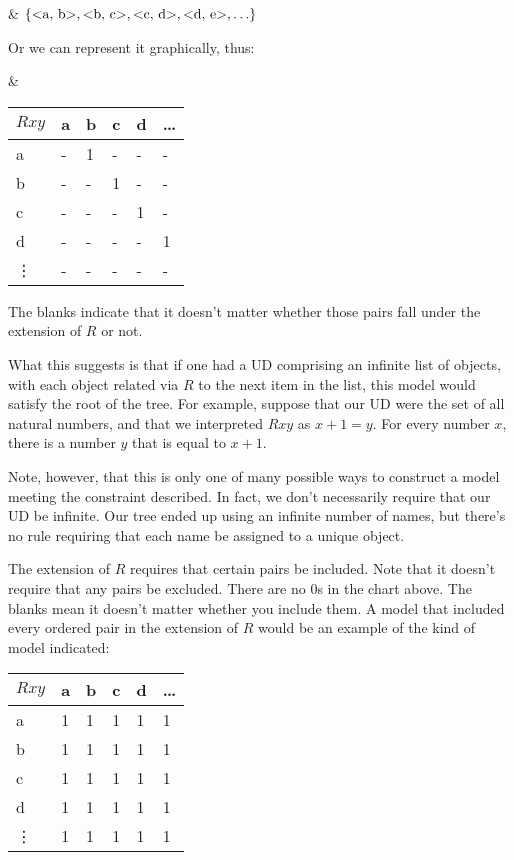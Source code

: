 \begin{partialmodel}
	 & $ \{\mbox{\ensuremath{\mathopen{<}}a, b\ensuremath{\mathclose{>}}}, \mbox{\ensuremath{\mathopen{<}}b, c\ensuremath{\mathclose{>}}}, \mbox{\ensuremath{\mathopen{<}}c, d\ensuremath{\mathclose{>}}}, \mbox{\ensuremath{\mathopen{<}}d, e\ensuremath{\mathclose{>}}}, \ldots\}$
\end{partialmodel}

Or we can represent it graphically, thus: 

\begin{partialmodel}
	 & \begin{tabular}{l|lllll}
$Rxy$   & a & b & c & d & \ldots \\ \hline
a   & - & 1 & - & - & -   \\
b   & - & - & 1 & - & -   \\
c   & - & - & - & 1 & -   \\
d   & - & - & - & - & 1   \\
\vdots & - & - & - & - & -
\end{tabular}
\end{partialmodel}



The blanks indicate that it doesn't matter whether those pairs fall under the extension of $R$ or not.

What this suggests is that if one had a UD comprising an infinite list of objects, with each object related via $R$ to the next item in the list, this model would satisfy the root of the tree. For example, suppose that our UD were the set of all natural numbers, and that we interpreted $Rxy$ as $x+1=y$. For every number $x$, there is a number $y$ that is equal to $x+1$.

Note, however, that this is only one of many possible ways to construct a model meeting the constraint described. In fact, we don't necessarily require that our UD be infinite. Our tree ended up using an infinite number of names, but there's no rule requiring that each name be assigned to a unique object.

The extension of $R$ requires that certain pairs be included. Note that it doesn't require that any pairs be excluded. There are no 0s in the chart above. The blanks mean it doesn't matter whether you include them. A model that included every ordered pair in the extension of $R$ would be an example of the kind of model indicated:

\begin{table}[h!]
\centering
\begin{tabular}{l|lllll}
$Rxy$   & a & b & c & d & \ldots \\ \hline
a   & 1 & 1 & 1 & 1 & 1  \\
b   & 1 & 1 & 1 & 1 & 1  \\
c   & 1 & 1 & 1 & 1 & 1   \\
d   & 1 & 1 & 1 & 1 & 1   \\
\vdots & 1 & 1 & 1 & 1 & 1
\end{tabular}
\end{table}

